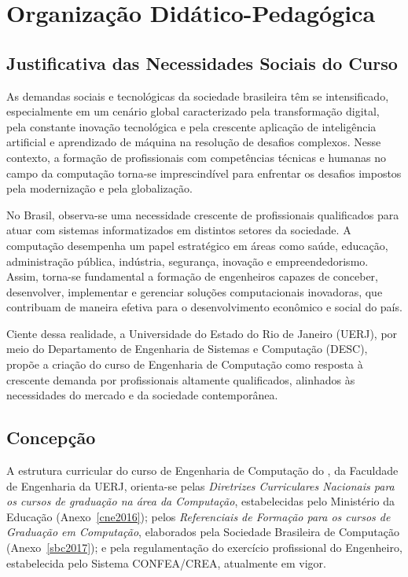 \chapter{Organização Didático-Pedagógica}
\thispagestyle{plain}

\section{Justificativa das Necessidades Sociais do Curso}

As demandas sociais e tecnológicas da sociedade brasileira têm se intensificado, especialmente em um cenário global caracterizado pela transformação digital, pela constante inovação tecnológica e pela crescente aplicação de inteligência artificial e aprendizado de máquina na resolução de desafios complexos. Nesse contexto, a formação de profissionais com competências técnicas e humanas no campo da computação torna-se imprescindível para enfrentar os desafios impostos pela modernização e pela globalização.

No Brasil, observa-se uma necessidade crescente de profissionais qualificados para atuar com sistemas informatizados em distintos setores da sociedade. A computação desempenha um papel estratégico em áreas como saúde, educação, administração pública, indústria, segurança, inovação e empreendedorismo. Assim, torna-se fundamental a formação de engenheiros capazes de conceber, desenvolver, implementar e gerenciar soluções computacionais inovadoras, que contribuam de maneira efetiva para o desenvolvimento econômico e social do país.

Ciente dessa realidade, a Universidade do Estado do Rio de Janeiro (UERJ), por meio do Departamento de Engenharia de Sistemas e Computação (DESC), propõe a criação do curso de Engenharia de Computação como resposta à crescente demanda por profissionais altamente qualificados, alinhados às necessidades do mercado e da sociedade contemporânea.

\section{Concepção}

A estrutura curricular do curso de Engenharia de Computação do \desc, da Faculdade de Engenharia da UERJ, orienta-se pelas \textit{Diretrizes Curriculares Nacionais para os cursos de graduação na área da Computação}, estabelecidas pelo Ministério da Educação (Anexo~\ref{cne2016}); pelos \textit{Referenciais de Formação para os cursos de Graduação em Computação}, elaborados pela Sociedade Brasileira de Computação (Anexo~\ref{sbc2017}); e pela regulamentação do exercício profissional do Engenheiro, estabelecida pelo Sistema CONFEA/CREA, atualmente em vigor.


